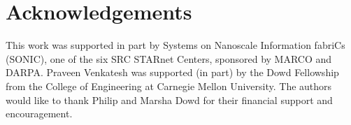 \documentclass[conference]{IEEEtran}
\providecommand{\v}{}
\renewcommand{\v}[1]{\underline{#1}}
\providecommand{\vhat}{}
\renewcommand{\vhat}[1]{\underline{\hat{#1}}}
\DeclarePairedDelimiter\abs{\lvert}{\rvert}
\DeclarePairedDelimiter\norm{\lVert}{\rVert}
\newcommand{\Phiorho}{\Phi\!\circ\!\rho}
\begin{document}







\newpage

\section*{Acknowledgements}

This work was supported in part by Systems on Nanoscale Information fabriCs
(SONIC), one of the six SRC STARnet Centers, sponsored by MARCO and DARPA.
Praveen Venkatesh was supported (in part) by the Dowd Fellowship from the
College of Engineering at Carnegie Mellon University. The authors would like to
thank Philip and Marsha Dowd for their financial support and encouragement.
\end{document}

